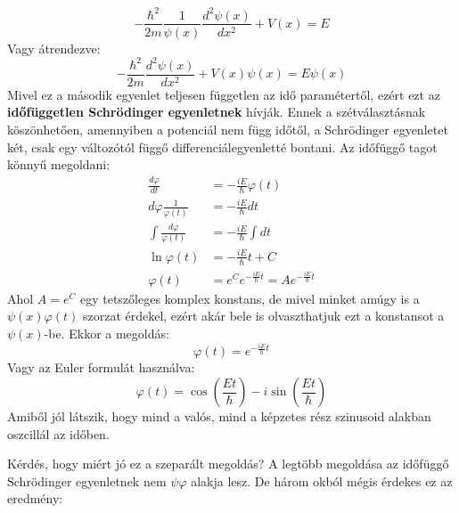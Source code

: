 \documentclass[../main.tex]{subfiles}
\begin{document}
\begin{equation}
    -\frac{\hbar^2}{2m} \frac{1}{\psi(x)} \frac{d^2 \psi(x)}{dx^2} + V(x) = E
\end{equation}
Vagy átrendezve:
\begin{equation}
    \boxed{-\frac{\hbar^2}{2m} \frac{d^2 \psi(x)}{dx^2} + V(x) \psi(x) = E \psi(x)}
\end{equation}
Mivel ez a második egyenlet teljesen független az idő paramétertől, ezért ezt az \textbf{időfüggetlen Schrödinger egyenletnek} hívják. Ennek a szétválasztásnak köszönhetően, amennyiben a potenciál nem függ időtől,
a Schrödinger egyenletet két, csak egy változótól függő differenciálegyenletté bontani. Az időfüggő tagot könnyű megoldani:
\begin{equation}
    \begin{aligned}
        \frac{d \varphi}{dt} &= -\frac{i E}{\hbar} \varphi(t) \\
        d \varphi \frac{1}{\varphi(t)} &= -\frac{i E}{\hbar} dt \\
        \int \frac{d \varphi}{\varphi(t)} &= -\frac{i E}{\hbar} \int dt \\
        \ln \varphi(t) &= -\frac{i E}{\hbar} t + C \\
        \varphi(t) &= e^{C} e^{-\frac{i E}{\hbar} t} = A e^{-\frac{i E}{\hbar} t}
    \end{aligned}
\end{equation}
Ahol $A = e^C$ egy tetszőleges komplex konstans, de mivel minket amúgy is a $\psi(x)\varphi(t)$ szorzat érdekel, ezért akár bele is olvaszthatjuk ezt a konstansot a $\psi(x)$-be. Ekkor a megoldás:
\begin{equation}
    \varphi(t) = e^{-\frac{i E}{\hbar} t}
\end{equation}
Vagy az Euler formulát használva:
\begin{equation}
    \varphi(t) = \cos\left(\frac{E t}{\hbar}\right) - i \sin\left(\frac{E t}{\hbar}\right)
\end{equation}
Amiből jól látszik, hogy mind a valós, mind a képzetes rész szinusoid alakban oszcillál az időben.

Kérdés, hogy miért jó ez a szeparált megoldás? A legtöbb megoldása az időfüggő Schrödinger egyenletnek nem $\psi \varphi$ alakja lesz. De három okból mégis érdekes ez az eredmény:
\end{document}
